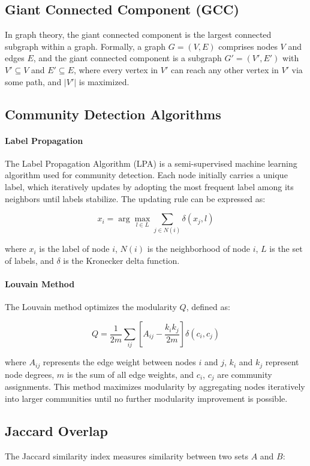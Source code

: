 \documentclass{article}
\theoremstyle{definition}
\begin{document}
\subsection{Giant Connected Component (GCC)}
In graph theory, the giant connected component is the largest connected subgraph within a graph. Formally, a graph $G = (V, E)$ comprises nodes $V$ and edges $E$, and the giant connected component is a subgraph $G' = (V', E')$ with $V' \subseteq V$ and $E' \subseteq E$, where every vertex in $V'$ can reach any other vertex in $V'$ via some path, and $|V'|$ is maximized.

\subsection{Community Detection Algorithms}

\paragraph{Label Propagation}
The Label Propagation Algorithm (LPA) is a semi-supervised machine learning algorithm used for community detection. Each node initially carries a unique label, which iteratively updates by adopting the most frequent label among its neighbors until labels stabilize. The updating rule can be expressed as:

$$
x_i = \arg\max_{l \in L} \sum_{j \in N(i)} \delta(x_j, l)
$$

where $x_i$ is the label of node $i$, $N(i)$ is the neighborhood of node $i$, $L$ is the set of labels, and $\delta$ is the Kronecker delta function.

\paragraph{Louvain Method}
The Louvain method optimizes the modularity $Q$, defined as:

$$
Q = \frac{1}{2m} \sum_{ij}\left[A_{ij} - \frac{k_i k_j}{2m}\right]\delta(c_i, c_j)
$$

where $A_{ij}$ represents the edge weight between nodes $i$ and $j$, $k_i$ and $k_j$ represent node degrees, $m$ is the sum of all edge weights, and $c_i$, $c_j$ are community assignments. This method maximizes modularity by aggregating nodes iteratively into larger communities until no further modularity improvement is possible.


\subsection{Jaccard Overlap}
The Jaccard similarity index measures similarity between two sets $A$ and $B$:
\end{document}

